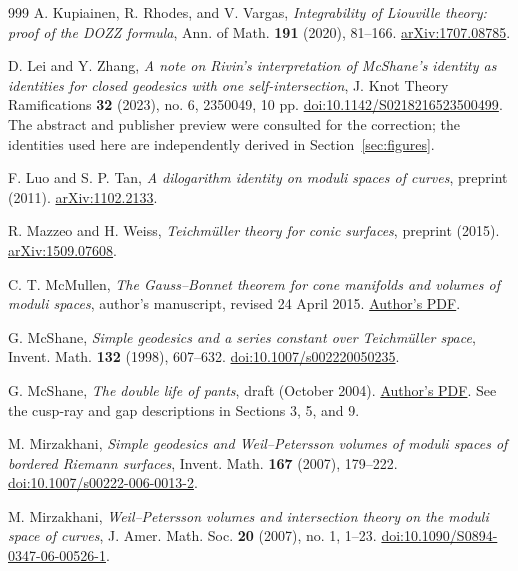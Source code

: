 \documentclass[11pt,a4paper]{article}
\numberwithin{equation}{section}
\theoremstyle{definition}
\theoremstyle{remark}
\begin{document}
\begin{thebibliography}{999}
A. Kupiainen, R. Rhodes, and V. Vargas,
\emph{Integrability of Liouville theory: proof of the DOZZ formula},
Ann. of Math. \textbf{191} (2020), 81--166.
\href{https://arxiv.org/abs/1707.08785}{arXiv:1707.08785}.

D. Lei and Y. Zhang,
\emph{A note on Rivin's interpretation of McShane's identity as identities
for closed geodesics with one self-intersection},
J. Knot Theory Ramifications \textbf{32} (2023), no. 6, 2350049, 10 pp.
\href{https://doi.org/10.1142/S0218216523500499}{doi:10.1142/S0218216523500499}.
The abstract and publisher preview were consulted for the correction;
the identities used here are independently derived in Section~\ref{sec:figures}.

F. Luo and S. P. Tan,
\emph{A dilogarithm identity on moduli spaces of curves},
preprint (2011).
\href{https://arxiv.org/abs/1102.2133}{arXiv:1102.2133}.

R. Mazzeo and H. Weiss,
\emph{Teichm\"uller theory for conic surfaces}, preprint (2015).
\href{https://arxiv.org/abs/1509.07608}{arXiv:1509.07608}.

C. T. McMullen,
\emph{The Gauss--Bonnet theorem for cone manifolds and volumes of moduli spaces},
author's manuscript, revised 24 April 2015.
\href{https://people.math.harvard.edu/~ctm/papers/home/text/papers/gb/gb.pdf}{Author's PDF}.

G. McShane,
\emph{Simple geodesics and a series constant over Teichm\"uller space},
Invent. Math. \textbf{132} (1998), 607--632.
\href{https://doi.org/10.1007/s002220050235}{doi:10.1007/s002220050235}.

G. McShane,
\emph{The double life of pants}, draft (October 2004).
\href{https://macbuse.github.io/M2R_2019/shearsAgain.pdf}{Author's PDF}.
See the cusp-ray and gap descriptions in Sections 3, 5, and 9.

M. Mirzakhani,
\emph{Simple geodesics and Weil--Petersson volumes of moduli spaces of
bordered Riemann surfaces},
Invent. Math. \textbf{167} (2007), 179--222.
\href{https://doi.org/10.1007/s00222-006-0013-2}{doi:10.1007/s00222-006-0013-2}.

M. Mirzakhani,
\emph{Weil--Petersson volumes and intersection theory on the moduli space
of curves}, J. Amer. Math. Soc. \textbf{20} (2007), no. 1, 1--23.
\href{https://doi.org/10.1090/S0894-0347-06-00526-1}{doi:10.1090/S0894-0347-06-00526-1}.


\end{thebibliography}
\end{document}
